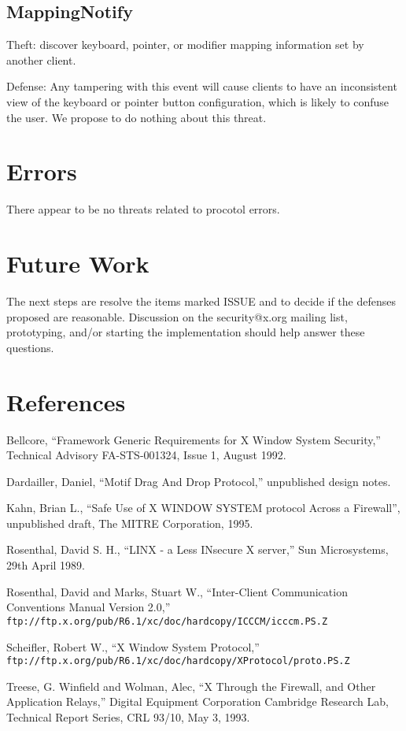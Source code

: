 \subsection{MappingNotify}

Theft: discover keyboard, pointer, or modifier mapping information
set by another client.

Defense: Any tampering with this event will cause clients to have an
inconsistent view of the keyboard or pointer button configuration,
which is likely to confuse the user.  We propose to do nothing about
this threat.


\section{Errors}

There appear to be no threats related to procotol errors.



\section{Future Work}

The next steps are resolve the items marked ISSUE and to decide if the
defenses proposed are reasonable.  Discussion on the security@x.org
mailing list, prototyping, and/or starting the implementation should
help answer these questions.



\section{References}

Bellcore, ``Framework Generic Requirements for X Window System Security,''
Technical Advisory FA-STS-001324, Issue 1, August 1992.

Dardailler, Daniel, ``Motif Drag And Drop Protocol,'' unpublished
design notes.

Kahn, Brian L., ``Safe Use of X WINDOW SYSTEM protocol Across a
Firewall'', unpublished draft, The MITRE Corporation, 1995.

Rosenthal, David S. H., ``LINX - a Less INsecure X server,'' Sun Microsystems,
29th April 1989.

Rosenthal, David and Marks, Stuart W., ``Inter-Client Communication
Conventions Manual Version 2.0,''
{\tt ftp://ftp.x.org/pub/R6.1/xc/doc/hardcopy/ICCCM/icccm.PS.Z}

Scheifler, Robert W., ``X Window System Protocol,''
{\tt ftp://ftp.x.org/pub/R6.1/xc/doc/hardcopy/XProtocol/proto.PS.Z}

Treese, G. Winfield and Wolman, Alec, ``X Through the Firewall, and
Other Application Relays,'' Digital Equipment Corporation Cambridge
Research Lab, Technical Report Series, CRL 93/10, May 3, 1993.


